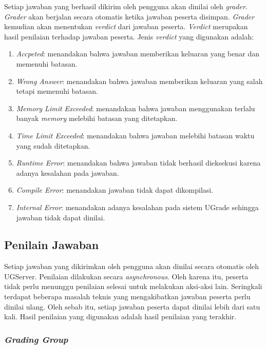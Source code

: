\par Setiap jawaban yang berhasil dikirim oleh pengguna akan dinilai oleh \textit{grader}. \textit{Grader} akan berjalan secara otomatis ketika jawaban peserta disimpan. \textit{Grader} kemudian akan menentukan \textit{verdict} dari jawaban peserta. \textit{Verdict} merupakan hasil penilaian terhadap jawaban peserta. Jenis \textit{verdict} yang digunakan adalah:
\begin{enumerate}
    \item \textit{Accpeted}: menandakan bahwa jawaban memberikan keluaran yang benar dan memenuhi batasan.
    \item \textit{Wrong Answer}: menandakan bahwa jawaban memberikan keluaran yang salah tetapi memenuhi batasan.
    \item \textit{Memory Limit Exceeded}: menandakan bahwa jawaban menggunakan terlalu banyak \textit{memory} melebihi batasan yang ditetapkan.
    \item \textit{Time Limit Exceeded}: menandakan bahwa jawaban melebihi batasan waktu yang sudah ditetapkan.
    \item \textit{Runtime Error}: menandakan bahwa jawaban tidak berhasil dieksekusi karena adanya kesalahan pada jawaban.
    \item \textit{Compile Error}: menandakan jawaban tidak dapat dikompilasi.
    \item \textit{Internal Error}: menandakan adanya kesalahan pada sistem UGrade sehingga jawaban tidak dapat dinilai.
\end{enumerate}

\subsection{Penilain Jawaban}

\par Setiap jawaban yang dikirimkan oleh pengguna akan dinilai secara otomatis oleh UGServer. Penilaian dilakukan secara \textit{asynchronous}. Oleh karena itu, peserta tidak perlu menunggu penilaian selesai untuk melakukan aksi-aksi lain. Seringkali terdapat beberapa masalah teknis yang mengakibatkan jawaban peserta perlu dinilai ulang. Oleh sebab itu, setiap jawaban peserta dapat dinilai lebih dari satu kali. Hasil penilaian yang digunakan adalah hasil penilaian yang terakhir.

\subsubsection{\textit{Grading Group}}

